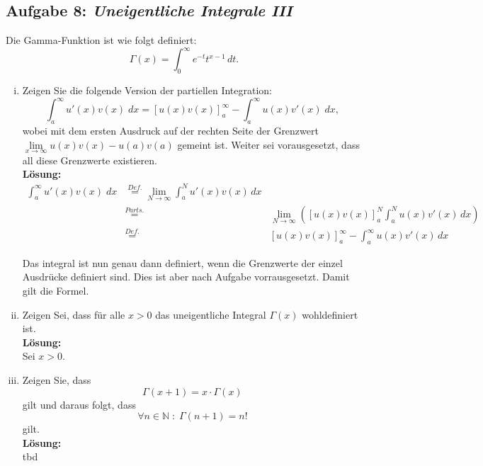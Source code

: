 \documentclass[11pt,a4paper,ngerman]{article}
\begin{document}

\subsection*{Aufgabe 8: \mdseries\itshape Uneigentliche Integrale III}

Die Gamma-Funktion ist wie folgt definiert:
$$
	\Gamma (x) = \int_0^\infty e^{-t}t^{x-1} \, dt.
$$

\begin{enumerate}[(i)]
	\item Zeigen Sie die folgende Version der partiellen Integration:
		$$
			\int_a^\infty u'(x)v(x) \; dx = \left[ u(x)v(x) \right]_a^\infty - \int_a^\infty u(x)v'(x) \; dx,
		$$
		wobei mit dem ersten Ausdruck auf der rechten Seite der Grenzwert \\$\underset{x \rightarrow \infty}{\lim} u(x)v(x) - u(a)v(a)$ gemeint ist. 
		Weiter sei vorausgesetzt, dass all diese Grenzwerte existieren.\\
		
		\textbf{Lösung:}\\
		
		
		$$\begin{array}{rcl}
			\int_a^\infty u'(x)v(x) \; dx &\stackrel{Def.}{=} \underset{N \rightarrow \infty}{\lim} \int_a^N u'(x)v(x) \, dx\\
				&\stackrel{Parts.}{=}& \underset{N \rightarrow \infty}{\lim} \left( \left[ u(x)v(x) \right]_a^N  \int_a^N u(x)v'(x) \, dx \right)\\
				&\stackrel{Def.}{=}& \left[ u(x)v(x) \right]_a^\infty - \int_a^\infty u(x)v'(x) \, dx
		\end{array}$$

		Das integral ist nun genau dann definiert, wenn die Grenzwerte der einzel Ausdrücke definiert sind. Dies ist aber nach Aufgabe vorrausgesetzt. 
		Damit gilt die Formel.
	
	\item Zeigen Sei, dass für alle $x > 0$ das uneigentliche Integral $\Gamma (x)$ wohldefiniert ist.\\
		\textbf{Lösung:}\\
		
		Sei $x>0$.

	\item Zeigen Sie, dass
		$$
			\Gamma (x+1) = x \cdot \Gamma (x)
		$$
		gilt und daraus folgt, dass
		$$
			\forall n \in \mathbb{N} \; : \;\Gamma (n+1) = n!
		$$
		gilt.\\

		\textbf{Lösung:}\\
		tbd
\end{enumerate}

\label{LastPage}
\end{document}
